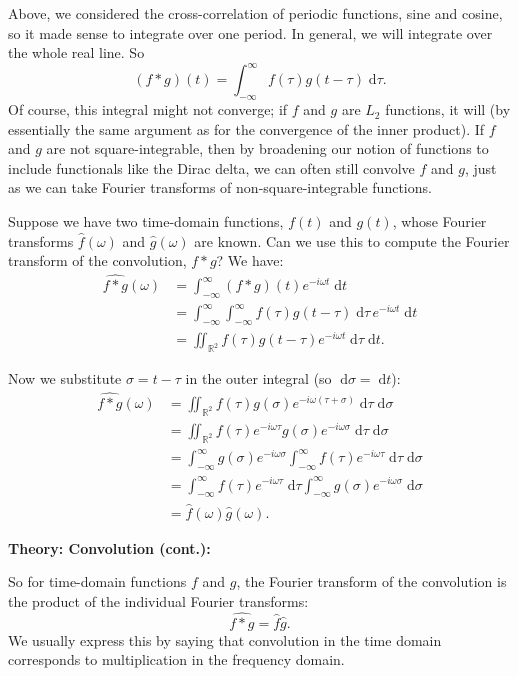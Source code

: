 \documentclass{article}
\newcommand{\diff}{\;\mathrm{d}}
\begin{document}
Above, we considered the cross-correlation of periodic functions, sine and cosine, so it made sense to integrate over one period. In general, we will integrate over the whole real line. So
\[(f\ast g)(t)=\int_{-\infty}^\infty f(\tau)g(t-\tau)\diff \tau.\]
Of course, this integral might not converge; if $f$ and $g$ are $L_2$ functions, it will (by essentially the same argument as for the convergence of the inner product). If $f$ and $g$ are not square-integrable, then by broadening our notion of functions to include functionals like the Dirac delta, we can often still convolve $f$ and $g$, just as we can take Fourier transforms of non-square-integrable functions.\bigskip



Suppose we have two time-domain functions, $f(t)$ and $g(t)$, whose Fourier transforms $\hat{f}(\omega)$ and $\hat{g}(\omega)$ are known. Can we use this to compute the Fourier transform of the convolution, $f\ast g$? We have:
\begin{align*}
	\widehat{f\ast g}(\omega) &=\int_{-\infty}^\infty (f\ast g)(t)e^{-i\omega t}\diff t\\
	&=\int_{-\infty}^\infty\int_{-\infty}^\infty f(\tau)g(t-\tau)\diff \tau\,e^{-i\omega t}\diff t\\
	&=\iint_{\mathbb{R}^2} f(\tau)g(t-\tau)e^{-i\omega t}\diff \tau\diff t.
\end{align*}

Now we substitute $\sigma=t-\tau$ in the outer integral (so $\diff \sigma =\diff t$):
\begin{align*}
	\widehat{f\ast g}(\omega)&= \iint_{\mathbb{R}^2} f(\tau)g(\sigma)e^{-i\omega (\tau+\sigma)}\diff \tau\diff\sigma\\
	&=\iint_{\mathbb{R}^2}f(\tau)e^{-i\omega \tau}g(\sigma)e^{-i\omega \sigma}\diff \tau\diff \sigma\\
	&=\int_{-\infty}^\infty g(\sigma) e^{-i\omega \sigma}\int_{-\infty}^\infty f(\tau)e^{-i\omega \tau}\diff \tau \diff\sigma\\
	&=\int_{-\infty}^\infty f(\tau)e^{-i\omega \tau}\diff \tau \int_{-\infty}^\infty g(\sigma)e^{-i\omega \sigma}\diff\sigma\\
	&=\hat{f}(\omega)\hat{g}(\omega).
\end{align*}


\clearpage


\textbf{Theory: Convolution (cont.):}\bigskip


So for time-domain functions $f$ and $g$, the Fourier transform of the convolution is the product of the individual Fourier transforms:
\[\widehat{f\ast g}=\hat{f}\hat{g}.\]
We usually express this by saying that convolution in the time domain corresponds to multiplication in the frequency domain.
\end{document}
